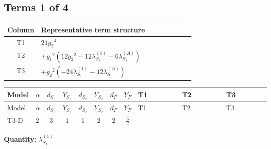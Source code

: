 \documentclass[8pt]{article}
\begin{document}
\begin{landscape}
\subsection*{Terms 1 of 4}
\begin{center}
\begin{tabular}{@{}c >{\raggedright\arraybackslash}p{0.82\linewidth}@{}}
\toprule
Column & Representative term structure \\
\midrule
T1 & \(\displaystyle 21 {g_2}^4\) \\
\midrule
T2 & \(\displaystyle +{g_1}^2 \left(12 {g_2}^2-12 {\lambda_{S_1}^{(1)}}-6 {\lambda_{S_1}^{(A)}}\right)\) \\
\midrule
T3 & \(\displaystyle +{g_2}^2 (-24 {\lambda_{S_1}^{(1)}}-12 {\lambda_{S_1}^{(A)}})\) \\
\midrule
\bottomrule
\end{tabular}
\end{center}
\smallskip
\tiny
\begin{longtable}{@{}llcccccc >{\raggedright\arraybackslash}p{0.21\linewidth} >{\raggedright\arraybackslash}p{0.21\linewidth} >{\raggedright\arraybackslash}p{0.21\linewidth}@{}}
\toprule
Model & $\alpha$ & $d_{S_1}$ & $Y_{S_1}$ & $d_{S_2}$ & $Y_{S_2}$ & $d_F$ & $Y_F$ & T1 & T2 & T3 \\
\midrule
\endfirsthead
\toprule
Model & $\alpha$ & $d_{S_1}$ & $Y_{S_1}$ & $d_{S_2}$ & $Y_{S_2}$ & $d_F$ & $Y_F$ & T1 & T2 & T3 \\
\midrule
\endhead
T3-D & $2$ & $3$ & $1$ & $1$ & $2$ & $2$ & $\frac{3}{2}$ & \scriptsize\adjustbox{max width=\linewidth}{$\begin{gathered} 21 {g_2}^4\end{gathered}$} & \scriptsize\adjustbox{max width=\linewidth}{$\begin{gathered} +{g_1}^2 \left(12 {g_2}^2-12 {\lambda_{S_1}^{(1)}}-6 {\lambda_{S_1}^{(A)}}\right)\end{gathered}$} & \scriptsize\adjustbox{max width=\linewidth}{$\begin{gathered} +{g_2}^2 (-24 {\lambda_{S_1}^{(1)}}-12 {\lambda_{S_1}^{(A)}})\end{gathered}$} \\
\midrule
\bottomrule
\end{longtable}
\clearpage
\noindent\textbf{Quantity: }$\lambda_{S_1}^{(1)}$\par\smallskip

\end{landscape}
\end{document}
